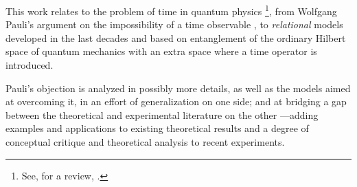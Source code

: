 This work relates to the problem of time in quantum physics%
\footnote{
  See, for a review, \cite{TQM1, TQM2}.
},
from Wolfgang Pauli's argument
on the impossibility of a time observable \parencite{PauliFootnote},
to \emph{relational} models developed in the last decades and based
on entanglement of the ordinary Hilbert space of quantum mechanics
with an extra space where a time operator is introduced.

Pauli's objection is analyzed in possibly more details, as well as the models
aimed at overcoming it, in an effort of generalization on one side;
and at bridging a gap between the theoretical
and experimental literature on the other
---adding examples and applications to existing theoretical results
and a degree of conceptual critique and theoretical analysis
to recent experiments.
